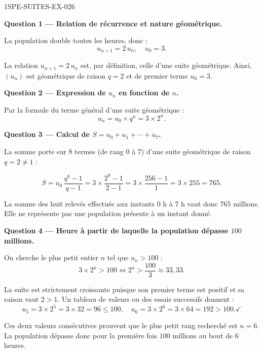 \begin{corrige}{1SPE-SUITES-EX-026}

\textbf{Question 1 — Relation de récurrence et nature géométrique.}

La population double toutes les heures, donc :
\[
  u_{n+1} = 2 \, u_n, \quad u_0 = 3.
\]

La relation $u_{n+1} = 2\,u_n$ est, par définition, celle d'une suite géométrique. Ainsi, $(u_n)$ est géométrique de raison $q = 2$ et de premier terme $u_0 = 3$.


\medskip
\textbf{Question 2 — Expression de $u_n$ en fonction de $n$.}

Par la formule du terme général d'une suite géométrique :
\[
  u_n = u_0 \times q^n = 3 \times 2^n.
\]

\medskip
\textbf{Question 3 — Calcul de $S = u_0 + u_1 + \cdots + u_7$.}

La somme porte sur $8$ termes (de rang $0$ à $7$) d'une suite géométrique de raison $q = 2
\neq 1$ :


\[
  S = u_0 \, \frac{q^8 - 1}{q - 1} = 3 \times \frac{2^8 - 1}{2 - 1} = 3 \times \frac{256 - 1}{1} = 3 \times 255 = 765.
\]

La somme des huit relevés effectués aux instants $0$ h à $7$ h vaut donc $765$ millions. Elle ne représente pas une population présente à un instant donné.

\medskip
\textbf{Question 4 — Heure à partir de laquelle la population dépasse $100$ millions.}

On cherche le plus petit entier $n$ tel que $u_n > 100$ :
\[
  3 \times 2^n > 100 \iff 2^n > \frac{100}{3} \approx 33{,}33.
\]

La suite est strictement croissante puisque son premier terme est positif et sa raison vaut $2>1$. Un tableau de valeurs ou des essais successifs donnent :
\[
  u_5 = 3 \times 2^5 = 3 \times 32 = 96 \leq 100, \quad u_6 = 3 \times 2^6 = 3 \times 64 = 192 > 100. \checkmark
\]

Ces deux valeurs consécutives prouvent que le plus petit rang recherché est $n=6$. La population dépasse donc pour la première fois $100$ millions au bout de $6$ heures.

\end{corrige}
